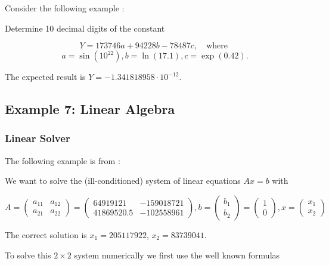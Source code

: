 Consider the following example \citep{Ghazi2010} : 

Determine 10 decimal digits of the constant

\begin{equation}
Y = 173746a + 94228b - 78487c, \quad \text{where } 
\end{equation}
\begin{equation}
a = \sin(10^{22}), b = \ln(17.1), c = \exp(0.42). 
\end{equation}

The expected result is $Y = -1.341818958 \cdot 10^{-12}$.





\subsection{Example 7: Linear Algebra}


\subsubsection{Linear Solver}
The following example is from \cite{Hofschuster2004}:

We want to solve the (ill-conditioned) system of linear equations $Ax = b$ with

\begin{equation}
A = \begin{pmatrix}
a_{11} & a_{12} \\
a_{21} & a_{22} 
\end{pmatrix}  = \begin{pmatrix}
64919121 & -159018721 \\
41869520.5 & -102558961 
\end{pmatrix}, b = \begin{pmatrix}
b_{1} \\
b_{2} 
\end{pmatrix}
= \begin{pmatrix}
1 \\
0
\end{pmatrix} , x = \begin{pmatrix}
x_{1} \\
x_{2} 
\end{pmatrix}
\end{equation}

The correct solution is $x_1 = 205117922$, $x_2 = 83739041$.

To solve this $2 \times 2$ system numerically we first use the well known formulas


